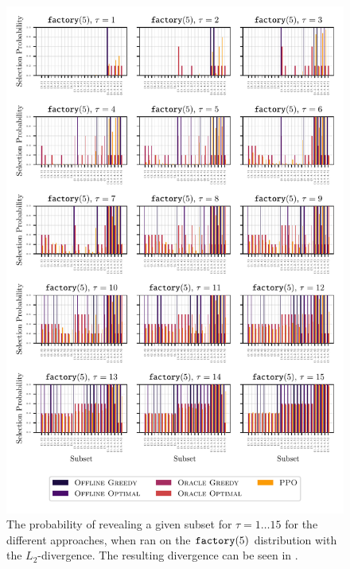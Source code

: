 \begin{figure}[t!]
  \centering
	\includegraphics[width=\textwidth]{figures/l2_norm_predictible_factory5_coalition_bars.pdf}
	\caption{ The probability of revealing a given subset for $\tau=1\ldots 15$ for the different approaches, when ran on the $\factory[5]$ distribution with the $ L_2 $-divergence. 
		The resulting divergence can be seen in .
	}
\end{figure}

